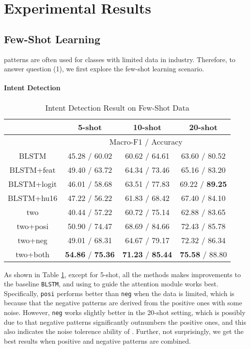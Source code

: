 \section{Experimental Results}
\label{sec:experiments}

\subsection{Few-Shot Learning}
\RE patterns are often used for classes with limited data in industry. Therefore, to answer question (1), we first explore the few-shot learning scenario.


\paragraph{Intent Detection}

\begin{table}
\setlength{\tabcolsep}{0.23em}
\centering
\small{
\begin{tabular}{|c|c|c|c|}

\hline
  & \multicolumn{1}{|c|}{5-shot} & \multicolumn{1}{|c|}{10-shot} & \multicolumn{1}{|c|}{20-shot}  \\
 \hline
  & \multicolumn{3}{|c|}{Macro-F1 / Accuracy} \\
\hline
BLSTM & 45.28 / 60.02 & 60.62 / 64.61 & 63.60 / 80.52  \\
\hline
BLSTM+feat & 49.40 / 63.72 & 64.34 / 73.46 & 65.16 / 83.20   \\
\hline
BLSTM+logit & 46.01 / 58.68 & 63.51 / 77.83 & 69.22 / \textbf{89.25} \\
\hline
BLSTM+hu16 & 47.22 / 56.22 & 61.83 / 68.42 & 67.40 / 84.10  \\
\hline
two & 40.44 / 57.22 & 60.72 / 75.14 & 62.88 / 83.65  \\
\hline
two+posi & 50.90 / 74.47 & 68.69 / 84.66 & 72.43 / 85.78  \\
\hline
two+neg & 49.01 / 68.31 & 64.67 / 79.17 & 72.32 / 86.34   \\
\hline
two+both & \textbf{54.86} / \textbf{75.36} & \textbf{71.23} / \textbf{85.44} & \textbf{75.58} / 88.80   \\
\hline

\end{tabular}
}
\caption{Intent Detection Result on Few-Shot Data}
\label{tab_intent_few}
\end{table}

As shown in Table \ref{tab_intent_few}, except for 5-shot, all the methods makes improvements to the baseline \texttt{BLSTM}, and using \RE to guide the attention module works best. Specifically, \texttt{posi} performs better than \texttt{neg} when the data is limited, which is because that the negative patterns are derived from the positive ones with some noise. However, \texttt{neg} works slightly better in the 20-shot setting, which is possibly due to that negative patterns significantly outnumbers the positive ones, and this also indicates the noise tolerence ability of \NN. Further, not surprisingly, we get the best results when positive and negative patterns are combined.

